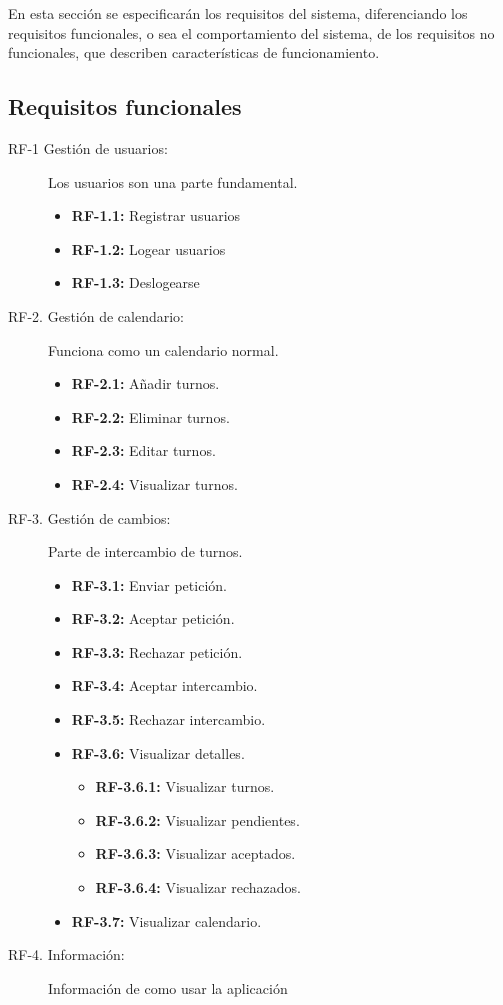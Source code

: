 En esta sección se especificarán los requisitos del sistema, diferenciando los requisitos funcionales, o sea el comportamiento del sistema, de los requisitos no funcionales, que describen características de funcionamiento.
\subsection{Requisitos funcionales}\label{r-funcionales}
\begin{description}
    \item[RF-1 Gestión de usuarios:] Los usuarios son una parte fundamental.
    \begin{itemize}
         \item \textbf{RF-1.1:} Registrar usuarios
         \item \textbf{RF-1.2:} Logear usuarios
         \item \textbf{RF-1.3:} Deslogearse
    \end{itemize}
   \item[RF-2. Gestión de calendario:] Funciona como un calendario normal.
    \begin{itemize}
         \item \textbf{RF-2.1:} Añadir turnos.
         \item \textbf{RF-2.2:} Eliminar turnos.
         \item \textbf{RF-2.3:} Editar turnos.
         \item \textbf{RF-2.4:} Visualizar turnos.
    \end{itemize}
 	   \item[RF-3. Gestión de cambios:] Parte de intercambio de turnos.
    \begin{itemize}
         \item \textbf{RF-3.1:} Enviar petición.
         \item \textbf{RF-3.2:} Aceptar petición.
         \item \textbf{RF-3.3:} Rechazar petición. 
         \item \textbf{RF-3.4:} Aceptar intercambio.
         \item \textbf{RF-3.5:} Rechazar intercambio.
         \item \textbf{RF-3.6:} Visualizar detalles.
           \begin{itemize}
             \item \textbf{RF-3.6.1:} Visualizar turnos.
             \item \textbf{RF-3.6.2:} Visualizar pendientes.
             \item \textbf{RF-3.6.3:} Visualizar aceptados.
             \item \textbf{RF-3.6.4:} Visualizar rechazados.
           \end{itemize}
         \item \textbf{RF-3.7:} Visualizar calendario.
    \end{itemize}
       
    
    
   \item[RF-4. Información:] Información de como usar la aplicación
\end{description}

